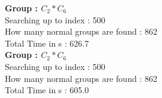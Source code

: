 \textbf{Group : $C_2*C_6$}\\
Searching up to index : 500\\
How many normal groups are found : 862\\
Total Time in s : 626.7\\
\textbf{Group : $C_2*C_6$}\\
Searching up to index : 500\\
How many normal groups are found : 862\\
Total Time in s : 605.0\\
